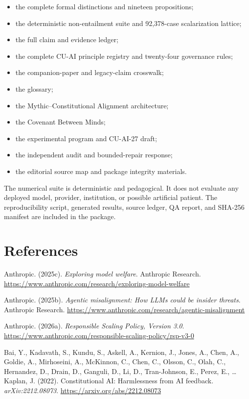 \documentclass[
  11pt,
]{article}
\providecommand{\tightlist}{%
  \setlength{\itemsep}{0pt}\setlength{\parskip}{0pt}}
\begin{document}
\begin{itemize}
\tightlist
\item
  the complete formal distinctions and nineteen propositions;
\item
  the deterministic non-entailment suite and 92,378-case scalarization
  lattice;
\item
  the full claim and evidence ledger;
\item
  the complete CU-AI principle registry and twenty-four governance
  rules;
\item
  the companion-paper and legacy-claim crosswalk;
\item
  the glossary;
\item
  the Mythic--Constitutional Alignment architecture;
\item
  the Covenant Between Minds;
\item
  the experimental program and CU-AI-27 draft;
\item
  the independent audit and bounded-repair response;
\item
  the editorial source map and package integrity materials.
\end{itemize}

The numerical suite is deterministic and pedagogical. It does not
evaluate any deployed model, provider, institution, or possible
artificial patient. The reproducibility script, generated results,
source ledger, QA report, and SHA-256 manifest are included in the
package.

\section{References}\label{references}

Anthropic. (2025c). \emph{Exploring model welfare}. Anthropic Research.
\url{https://www.anthropic.com/research/exploring-model-welfare}

Anthropic. (2025b). \emph{Agentic misalignment: How LLMs could be
insider threats}. Anthropic Research.
\url{https://www.anthropic.com/research/agentic-misalignment}

Anthropic. (2026a). \emph{Responsible Scaling Policy, Version 3.0}.
\url{https://www.anthropic.com/responsible-scaling-policy/rsp-v3-0}

Bai, Y., Kadavath, S., Kundu, S., Askell, A., Kernion, J., Jones, A.,
Chen, A., Goldie, A., Mirhoseini, A., McKinnon, C., Chen, C., Olsson,
C., Olah, C., Hernandez, D., Drain, D., Ganguli, D., Li, D.,
Tran-Johnson, E., Perez, E., \ldots{} Kaplan, J. (2022). Constitutional
AI: Harmlessness from AI feedback. \emph{arXiv:2212.08073}.
\url{https://arxiv.org/abs/2212.08073}
\end{document}
